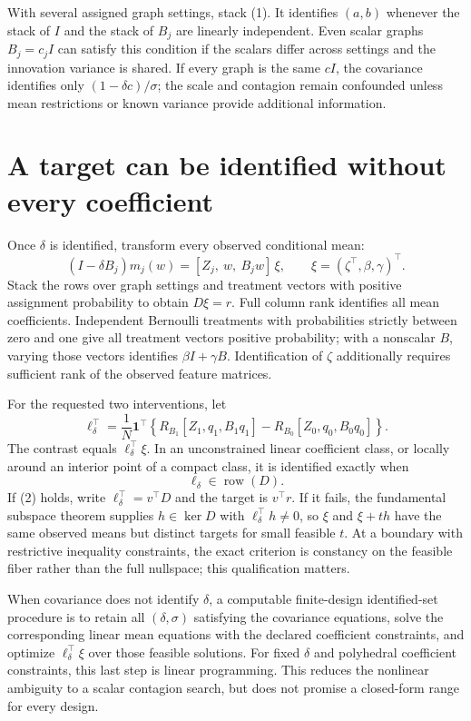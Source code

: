 \documentclass[11pt]{article}
\begin{document}
With several assigned graph settings, stack (1). It identifies $(a,b)$ whenever the stack of $I$ and the stack of $B_j$ are linearly independent. Even scalar graphs $B_j=c_jI$ can satisfy this condition if the scalars differ across settings and the innovation variance is shared. If every graph is the same $cI$, the covariance identifies only $(1-\delta c)/\sigma$; the scale and contagion remain confounded unless mean restrictions or known variance provide additional information.

\section*{A target can be identified without every coefficient}
Once $\delta$ is identified, transform every observed conditional mean:
\[
 (I-\delta B_j)m_j(w)
 =[Z_j,\ w,\ B_jw]\,\xi,
 \qquad \xi=(\zeta^\top,\beta,\gamma)^\top.
\]
Stack the rows over graph settings and treatment vectors with positive assignment probability to obtain $D\xi=r$. Full column rank identifies all mean coefficients. Independent Bernoulli treatments with probabilities strictly between zero and one give all treatment vectors positive probability; with a nonscalar $B$, varying those vectors identifies $\beta I+\gamma B$. Identification of $\zeta$ additionally requires sufficient rank of the observed feature matrices.

For the requested two interventions, let
\[
 \ell_\delta^\top=\frac1N\mathbf1^\top
 \left\{R_{B_1}[Z_1,q_1,B_1q_1]
       -R_{B_0}[Z_0,q_0,B_0q_0]\right\}.
\]
The contrast equals $\ell_\delta^\top\xi$. In an unconstrained linear coefficient class, or locally around an interior point of a compact class, it is identified exactly when
\[
 \ell_\delta\in\operatorname{row}(D).\tag{2}
\]
If (2) holds, write $\ell_\delta^\top=v^\top D$ and the target is $v^\top r$. If it fails, the fundamental subspace theorem supplies $h\in\ker D$ with $\ell_\delta^\top h\ne0$, so $\xi$ and $\xi+th$ have the same observed means but distinct targets for small feasible $t$. At a boundary with restrictive inequality constraints, the exact criterion is constancy on the feasible fiber rather than the full nullspace; this qualification matters.

When covariance does not identify $\delta$, a computable finite-design identified-set procedure is to retain all $(\delta,\sigma)$ satisfying the covariance equations, solve the corresponding linear mean equations with the declared coefficient constraints, and optimize $\ell_\delta^\top\xi$ over those feasible solutions. For fixed $\delta$ and polyhedral coefficient constraints, this last step is linear programming. This reduces the nonlinear ambiguity to a scalar contagion search, but does not promise a closed-form range for every design.
\end{document}
